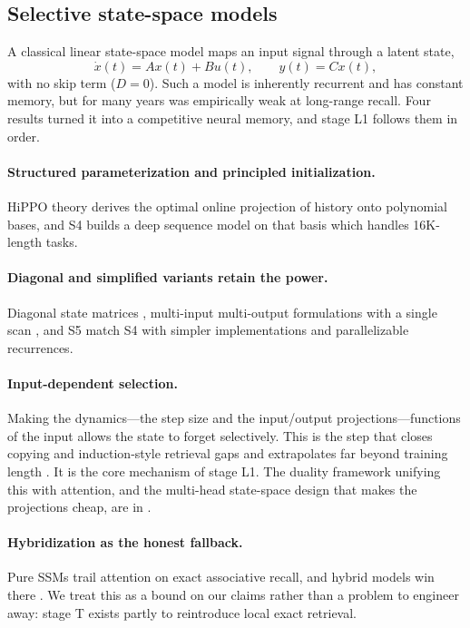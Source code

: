 \documentclass[11pt,a4paper]{article}
\theoremstyle{plain}
\theoremstyle{definition}
\theoremstyle{remark}
\begin{document}
\subsection{Selective state-space models}

\noindent
A classical linear state-space model maps an input signal through a latent
state,
\begin{equation}
  \dot{x}(t) = A x(t) + B u(t), \qquad y(t) = C x(t),
  \label{eq:ssm-continuous}
\end{equation}
with no skip term ($D = 0$). Such a model is inherently recurrent and has
constant memory, but for many years was empirically weak at long-range
recall. Four results turned it into a competitive neural memory, and stage L1
follows them in order.

\paragraph{Structured parameterization and principled initialization.}
HiPPO theory \cite{gu2020hippo} derives the optimal online projection of
history onto polynomial bases, and S4 \cite{gu2021s4} builds a deep sequence
model on that basis which handles 16K-length tasks.

\paragraph{Diagonal and simplified variants retain the power.}
Diagonal state matrices \cite{gu2022s4d}, multi-input multi-output
formulations with a single scan \cite{gupta2022dss}, and S5
\cite{smith2022s5} match S4 with simpler implementations and parallelizable
recurrences.

\paragraph{Input-dependent selection.}
Making the dynamics---the step size and the input/output projections---functions
of the input allows the state to forget selectively. This is the step that
closes copying and induction-style retrieval gaps and extrapolates far beyond
training length \cite{gu2023mamba}. It is the core mechanism of stage L1. The
duality framework unifying this with attention, and the multi-head
state-space design that makes the projections cheap, are in
\cite{dao2024mamba2}.

\paragraph{Hybridization as the honest fallback.}
Pure SSMs trail attention on exact associative recall, and hybrid models win
there \cite{lieber2024jamba}. We treat this as a bound on our claims rather
than a problem to engineer away: stage T exists partly to reintroduce local
exact retrieval.
\end{document}
